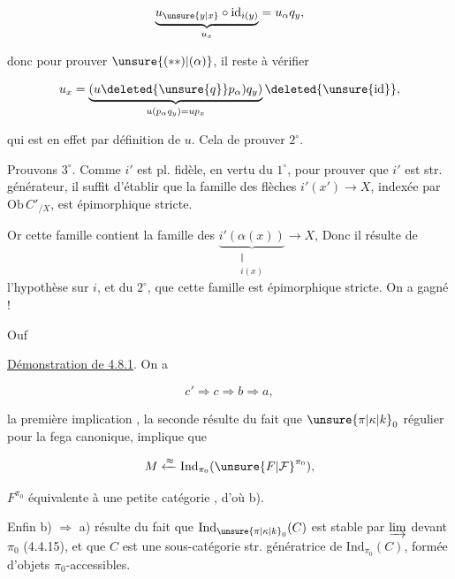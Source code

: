\[ \underbrace{u_{\unsure{y|x}}\circ\mathrm{id}_{i(y)}}_{u_x}=u_\alpha q_y, \]

donc pour prouver $\unsure{(**)|(\alpha)}$, il reste à vérifier

\[ u_x=\underbrace{(u\deleted{\unsure{q}}p_\alpha)q_y)}_{u(p_\alpha q_y)=up_x}\deleted{\unsure{\mathrm{id}}}, \]

qui est en effet  par définition de $u$. Cela  de prouver $2^\circ$.

Prouvons $3^\circ$. Comme $i'$ est pl. fidèle, en vertu du $1^\circ$, pour prouver que $i'$ est str. générateur, il suffit d'établir que  la famille des flèches $i'(x')\longrightarrow X$, indexée par $\mathrm{Ob}\,C'_{/X}$, est épimorphique stricte.

Or cette famille contient la famille des $\underbrace{i'(\alpha(x))}_{\substack{\Vert\\i(x)}}\longrightarrow X$,    Donc il résulte de l'hypothèse sur $i$, et du $2^\circ$, que cette famille est épimorphique stricte. On a gagné !

Ouf \par\hfill\unsure{$\backslash$}\hfill\null

\uline{Démonstration de 4.8.1}. On a

\[ c'\Longrightarrow c\Longrightarrow b\Longrightarrow a, \]

la première implication , la seconde résulte du fait que $\unsure{\pi|\kappa|k}_0$  régulier pour la fega canonique, implique que

\[ M\xleftarrow{\approx}\mathrm{Ind}_{\pi_0}(\unsure{F|\mathcal F}^{\pi_0}), \]

$F^{\pi_0}$ équivalente à une petite catégorie , d'où b). 

Enfin b) $\Longrightarrow$ a) résulte du fait que $\mathrm{Ind}_{\unsure{\pi|\kappa|k}_0}(C)$ est stable par $\varinjlim$  devant $\pi_0$ (4.4.15), et que $C$ est une sous-catégorie str. génératrice de $\mathrm{Ind}_{\pi_0}(C)$, formée d'objets $\pi_0$-accessibles.


